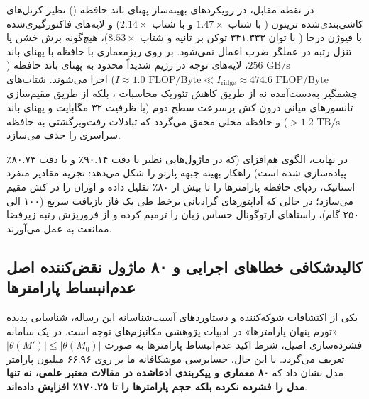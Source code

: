 در نقطه مقابل، در رویکردهای بهینه‌ساز پهنای باند حافظه () نظیر کرنل‌های کاشی‌بندی‌شده تریتون ( با شتاب $1.47\times$ و  با شتاب $2.14\times$) و لایه‌های فاکتورگیری‌شده با فیوژن درجا ( با توان ۳۴۱,۳۳۳ توکن بر ثانیه و شتاب $8.53\times$)، هیچ‌گونه برش خشن یا تنزل رتبه در عملگر ضرب اعمال نمی‌شود. بر روی ریزمعماری  با حافظه  با پهنای باند $256\text{ GB/s}$، لایه‌های توجه در رژیم شدیداً محدود به پهنای باند حافظه ($I \approx 1.0\text{ FLOP/Byte} \ll I_{\text{ridge}} \approx 474.6\text{ FLOP/Byte}$) اجرا می‌شوند. شتاب‌های چشمگیر به‌دست‌آمده نه از طریق کاهش تئوریک محاسبات ، بلکه از طریق مقیم‌سازی تانسورهای میانی درون کش پرسرعت سطح دوم (با ظرفیت ۳۲ مگابایت و پهنای باند $> 1.2\text{ TB/s}$) و حافظه محلی  محقق می‌گردد که تبادلات رفت‌وبرگشتی به حافظه سراسری  را حذف می‌سازد.

در نهایت، الگوی هم‌افزای  (که در ماژول‌هایی نظیر  با دقت ۹۰.۱۴٪ و  با دقت ۸۰.۷۳٪ پیاده‌سازی شده است) راهکار بهینه جبهه پارتو را شکل می‌دهد: تجزیه مقادیر منفرد استاتیک، ردپای حافظه پارامترها را تا بیش از ۸۰٪ تقلیل داده و اوزان را در کش  مقیم می‌سازد؛ در حالی که آداپتورهای گرادیانی برخط  طی یک فاز بازیافت سریع (۱۰۰ الی ۲۵۰ گام)، راستاهای ارتوگونال حساس زبان را ترمیم کرده و از فروریزش رتبه زیرفضا ممانعت به عمل می‌آورند.

\subsection{کالبدشکافی خطاهای اجرایی و ۸۰ ماژول نقض‌کننده اصل عدم‌انبساط پارامترها}
\label{sec:failure_forensics_persian}
یکی از اکتشافات شوکه‌کننده و دستاوردهای آسیب‌شناسانه این رساله، شناسایی پدیده «تورم پنهان پارامترها» در ادبیات پژوهشی مکانیزم‌های توجه است. در یک سامانه فشرده‌سازی اصیل، شرط اکید عدم‌انبساط پارامترها به صورت $|\theta(M')| \le |\theta(M_0)|$ تعریف می‌گردد. با این حال، حسابرسی موشکافانه ما بر روی ۶۶.۹۶ میلیون پارامتر مدل  نشان داد که \textbf{۸۰ معماری و پیکربندی ادعاشده در مقالات معتبر علمی، نه تنها مدل را فشرده نکرده بلکه حجم پارامترها را تا ۱۷۰.۲۵٪ افزایش داده‌اند}.

